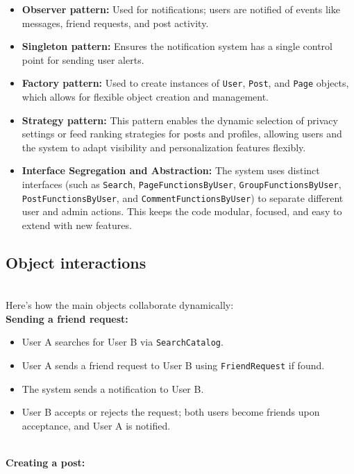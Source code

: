 \begin{itemize}
\item
\protect{}\label{Gi9x2niLuea9GWAGHwZ8W}
\textbf{Observer pattern:} Used for notifications; users are notified of events like messages, friend requests, and post activity.
\item
\protect{}\label{3ORewlh6JbsZJ1ky5qzWR}
\textbf{Singleton pattern:} Ensures the notification system has a single control point for sending user alerts.
\item
\protect{}\label{2X2kPdecQWyJkU24TIdmg}
\textbf{Factory pattern:} Used to create instances of \texttt{User}, \texttt{Post}, and \texttt{Page} objects, which allows for flexible object creation and management.
\item
\protect{}\label{rzd24xh6R5xWTxzZSsrK7}
\textbf{Strategy pattern:} This pattern enables the dynamic selection of privacy settings or feed ranking strategies for posts and profiles, allowing users and the system to adapt visibility and personalization features flexibly.
\item
\protect{}\label{OfeZUWUxqP0Bgiap2kdSo}
\textbf{Interface Segregation and Abstraction:} The system uses distinct interfaces (such as \texttt{Search}, \texttt{PageFunctionsByUser}, \texttt{GroupFunctionsByUser}, \texttt{PostFunctionsByUser}, and \texttt{CommentFunctionsByUser}) to separate different user and admin actions. This keeps the code modular, focused, and easy to extend with new features.
\end{itemize}

\subsection{Object interactions}\label{dbTc5MYR5EMox7SIFwot6}
\\
Here's how the main objects collaborate dynamically:
\\
\textbf{Sending a friend request:}

\begin{itemize}
\item
\protect{}\label{CCz0PMloPzGeNUcUk3iEV}
User A searches for User B via \texttt{SearchCatalog}.
\item
\protect{}\label{B9CEy_Qe5M5urFKWEeBQ6}
User A sends a friend request to User B using \texttt{FriendRequest} if found.
\item
\protect{}\label{8I697dDrCQuMOz5I1591O}
The system sends a notification to User B.
\item
\protect{}\label{vvreGxVol9aRWfHXSS_Cn}
User B accepts or rejects the request; both users become friends upon acceptance, and User A is notified.
\end{itemize}
\\
\textbf{Creating a post:}

